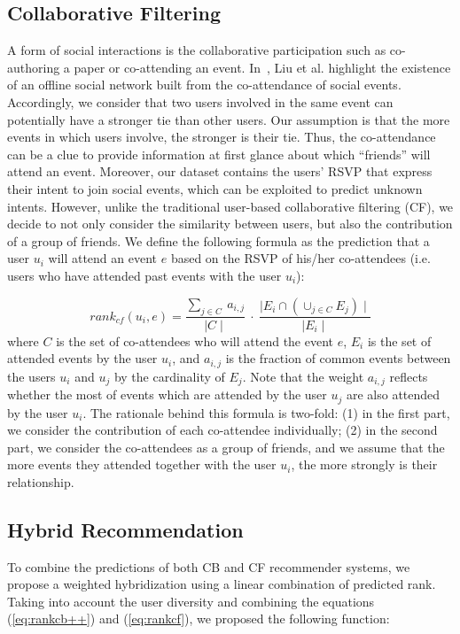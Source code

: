 \subsection{Collaborative Filtering}
A form of social interactions is the collaborative participation such as co-authoring a paper or co-attending an event. In~\cite{Liu:KDD12}, Liu et al. highlight the existence of an offline social network built from the co-attendance of social events. Accordingly, we consider that two users involved in the same event can potentially have a stronger tie than other users. Our assumption is that the more events in which users involve, the stronger is their tie. Thus, the co-attendance can be a clue to provide information at first glance about which ``friends'' will attend an event. Moreover, our dataset contains the users' RSVP that express their intent to join social events, which can be exploited to predict unknown intents. However, unlike the traditional user-based collaborative filtering (CF), we decide to not only consider the similarity between users, but also the contribution of a group of friends. We define the following formula as the prediction that a user $u_{i}$ will attend an event $e$ based on the RSVP of his/her co-attendees (i.e. users who have attended past events with the user $u_{i}$):


\begin{equation}\label{eq:rankcf}
rank_{cf}(u_{i},e)= \frac{\sum_{j \in C } \ a_{i,j}}{\mid C \mid } \ \cdot \  \frac{\mid E_{i} \cap ( \cup_{j \in C } E_{j}) \mid}{\mid E_{i} \mid}
\end{equation}
where $C$ is the set of co-attendees who will attend the event $e$, $E_{i}$ is the set of attended events by the user $u_{i}$, and $a_{i,j}$ is the fraction of common events between the users $u_{i}$ and $u_{j}$ by the cardinality of $E_{j}$. Note that the weight $a_{i,j}$ reflects whether the most of events which are attended by the user $u_{j}$ are also attended by the user $u_{i}$. The rationale behind this formula is two-fold: (1) in the first part, we consider the contribution of each co-attendee individually; (2) in the second part, we consider the co-attendees as a group of friends, and we assume that the more events they attended together with the user $u_{i}$, the more strongly is their relationship.


\subsection{Hybrid Recommendation}
To combine the predictions of both CB and CF recommender systems, we propose a weighted hybridization using a linear combination of predicted rank. Taking into account the user diversity and combining the equations (\ref{eq:rankcb++}) and (\ref{eq:rankcf}), we proposed the following function:


